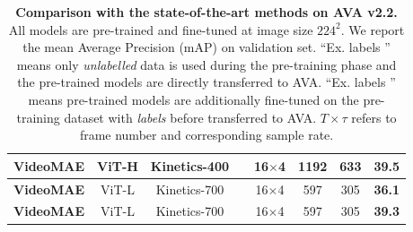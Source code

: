 \documentclass{article}
\newcommand{\cmark}{\ding{51}}%
\newcommand{\xmark}{\ding{55}}%
\def\x{$\times$}
\begin{document}
\begin{table}[t]
\begin{tabular}{l|c|c|c|c|c|c|c}
        \textbf{VideoMAE} & ViT-H & Kinetics-400 & \cmark & 16\x4 & 1192 & 633 & \textbf{39.5} \\
        \hline
        \textbf{VideoMAE} & ViT-L & Kinetics-700 & \xmark & 16\x4 & 597 & 305 & \textbf{36.1} \\
        \textbf{VideoMAE} & ViT-L & Kinetics-700 & \cmark & 16\x4 & 597 & 305 & \textbf{39.3} \\
	\end{tabular}
	\caption{\textbf{Comparison with the state-of-the-art methods on AVA v2.2.} All models are pre-trained and fine-tuned at image size $224^2$. We report the mean Average Precision (mAP) on validation set. ``Ex. labels \xmark '' means only \textit{unlabelled} data is used during the pre-training phase and the pre-trained models are directly transferred to AVA. ``Ex. labels \cmark'' means  pre-trained models are additionally fine-tuned on the pre-training dataset with \textit{labels} before transferred to AVA. $T \times \tau$ refers to frame number and corresponding sample rate.
}\label{sota:ava}
\vspace{-1.5em}
\end{table}
\end{document}
